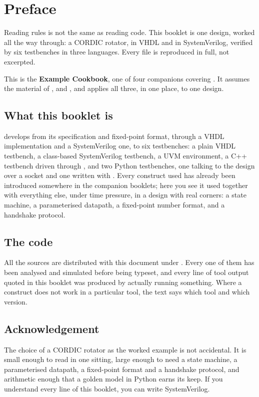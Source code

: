 \chapter*{Preface}

Reading rules is not the same as reading code. This booklet is one design,
worked all the way through: a CORDIC rotator, in VHDL and in SystemVerilog,
verified by six testbenches in three languages. Every file is reproduced in
full, not excerpted.

This is the \textbf{Example Cookbook}, one of four companions covering
. It assumes the material of
,  and , and applies all
three, in one place, to one design.

\section*{What this booklet is}

 develops  from its specification and
fixed-point format, through a VHDL implementation and a SystemVerilog one,
to six testbenches: a plain VHDL testbench, a class-based SystemVerilog
testbench, a UVM environment, a C++ testbench driven through
, and two Python testbenches, one talking to the design over
a socket and one written with . Every construct used has
already been introduced somewhere in the companion booklets; here you see it
used together with everything else, under time pressure, in a design with
real corners: a state machine, a parameterised datapath, a fixed-point
number format, and a handshake protocol.

\section*{The code}

All the sources are distributed with this document under .
Every one of them has been analysed and simulated before being typeset, and
every line of tool output quoted in this booklet was produced by actually
running something. Where a construct does not work in a particular tool, the
text says which tool and which version.

\section*{Acknowledgement}

The choice of a CORDIC rotator as the worked example is not accidental. It
is small enough to read in one sitting, large enough to need a state
machine, a parameterised datapath, a fixed-point format and a handshake
protocol, and arithmetic enough that a golden model in Python earns its
keep. If you understand every line of this booklet, you can write
SystemVerilog.

